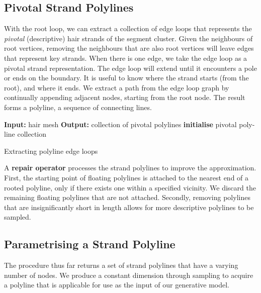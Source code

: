 \documentclass[ %
author={Dillon Keith Diep},
supervisor={Dr. Carl Henrik Ek},
degree={MEng},
title={ART-CG Hair:},
subtitle={Assisted Real-time Content Generation of Stylised Virtual Hair},
type={Research},
year={2017} ]{dissertation}
\begin{document}
\subsection{Pivotal Strand Polylines}
With the root loop, we can extract a collection of edge loops that represents the \textit{pivotal} (descriptive) hair strands of the segment cluster. Given the neighbours of root vertices, removing the neighbours that are also root vertices will leave edges that represent key strands. When there is one edge, we take the edge loop as a pivotal strand representation. The edge loop will extend until it encounters a pole or ends on the boundary. It is useful to know where the strand starts (from the root), and where it ends. We extract a path from the edge loop graph by continually appending adjacent nodes, starting from the root node. The result forms a polyline, a sequence of connecting lines.

\begin{algorithm}[!h]
	\algrule
	\textbf{Input:} hair mesh\;
	\textbf{Output:} collection of pivotal polylines\;
	\algrule
	\textbf{initialise}\;
	\Return pivotal poly-line collection\;
	\caption{Extracting polyline edge loops}
\end{algorithm}

A \textbf{repair operator} processes the strand polylines to improve the approximation. First, the starting point of floating polylines is attached to the nearest end of a rooted polyline, only if there exists one within a specified vicinity. We discard the remaining floating polylines that are not attached. Secondly, removing polylines that are insignificantly short in length allows for more descriptive polylines to be sampled.

\subsection{Parametrising a Strand Polyline}
The procedure thus far returns a set of strand polylines that have a varying number of nodes. We produce a constant dimension through sampling to acquire a polyline that is applicable for use as the input of our generative model.
\end{document}
